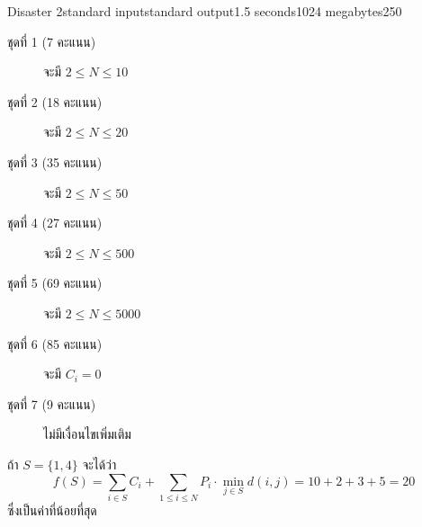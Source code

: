 \documentclass[11pt,a4paper]{article}
\begin{document}
\begin{problem}{Disaster 2}{standard input}{standard output}{1.5 seconds}{1024 megabytes}{250}
\begin{description}
\item[ชุดที่ 1 (7 คะแนน)] จะมี $2\leq N\leq 10$
\item[ชุดที่ 2 (18 คะแนน)] จะมี $2\leq N\leq 20$
\item[ชุดที่ 3 (35 คะแนน)] จะมี $2\leq N\leq 50$
\item[ชุดที่ 4 (27 คะแนน)] จะมี $2\leq N\leq 500$
\item[ชุดที่ 5 (69 คะแนน)] จะมี $2\leq N\leq 5000$
\item[ชุดที่ 6 (85 คะแนน)] จะมี $C_i=0$
\item[ชุดที่ 7 (9 คะแนน)] ไม่มีเงื่อนไขเพิ่มเติม

\end{description}

\Examples

\begin{example}
%
\end{example}

\Note

ถ้า $S=\{1,4\}$ จะได้ว่า \[f(S)=\sum\limits_{i\in S}C_i+\sum\limits_{1\leq i\leq N}P_i\cdot\min_{j\in S}d(i,j)=10+2+3+5=20\] ซึ่งเป็นค่าที่น้อยที่สุด

\end{problem}
\end{document}
